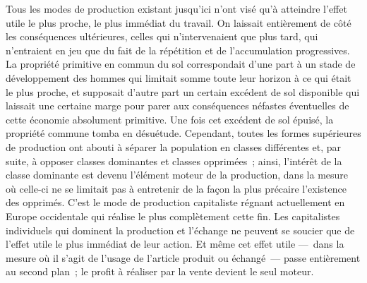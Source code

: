 \documentclass[french,twoside]{book} %
\begin{document}
Tous les modes de production existant jusqu’ici n’ont visé qu’à atteindre l’effet utile le plus proche, le plus immédiat du travail. On laissait entièrement de côté les conséquences ultérieures, celles qui n’intervenaient que plus tard, qui n’entraient en jeu que du fait de la répétition et de l’accumulation progressives. La propriété primitive en commun du sol correspondait d’une part à un stade de développement des hommes qui limitait somme toute leur horizon à ce qui était le plus proche, et supposait d’autre part un certain excédent de sol disponible qui laissait une certaine marge pour parer aux conséquences néfastes éventuelles de cette économie absolument primitive. Une fois cet excédent de sol épuisé, la propriété commune tomba en désuétude. Cependant, toutes les formes supérieures de production ont abouti à séparer la population en classes différentes et, par suite, à opposer classes dominantes et classes opprimées ; ainsi, l’intérêt de la classe dominante est devenu l’élément moteur de la production, dans la mesure où celle-ci ne se limitait pas à entretenir de la façon la plus précaire l’existence des opprimés. C’est le mode de production capitaliste régnant actuellement en Europe occidentale qui réalise le plus complètement cette fin. Les capitalistes individuels qui dominent la production et l’échange ne peuvent se soucier que de l’effet utile le plus immédiat de leur action. Et même cet effet utile — dans la mesure où il s’agit de l’usage de l’article produit ou échangé — passe entièrement au second plan ; le profit à réaliser par la vente devient le seul moteur.\par
\end{document}
